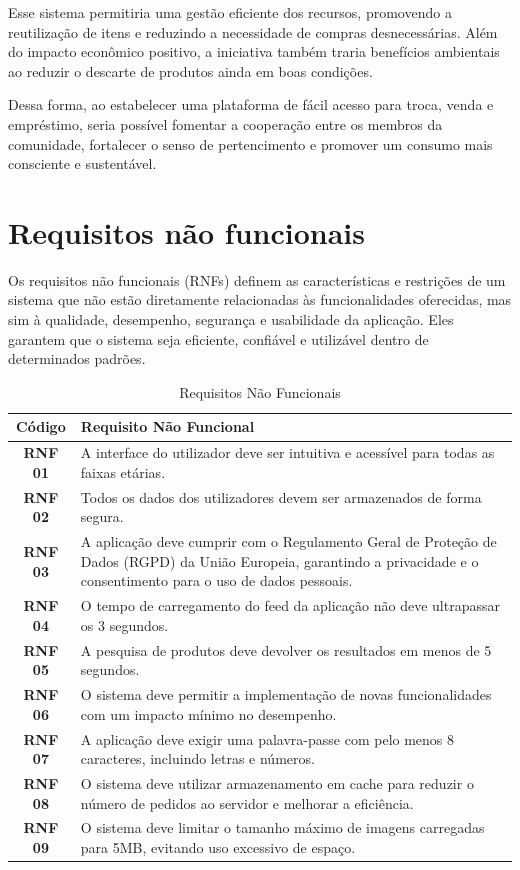\documentclass[a4paper, 12pt]{article} %
\begin{document}
Esse sistema permitiria uma gestão eficiente dos recursos, promovendo a reutilização de itens e reduzindo a necessidade de compras desnecessárias. Além do impacto econômico positivo, a iniciativa também traria benefícios ambientais ao reduzir o descarte de produtos ainda em boas condições.

Dessa forma, ao estabelecer uma plataforma de fácil acesso para troca, venda e empréstimo, seria possível fomentar a cooperação entre os membros da comunidade, fortalecer o senso de pertencimento e promover um consumo mais consciente e sustentável.

\newpage
\section*{Requisitos não funcionais}

Os requisitos não funcionais (RNFs) definem as características e restrições de um sistema que não estão diretamente relacionadas às funcionalidades oferecidas, mas sim à qualidade, desempenho, segurança e usabilidade da aplicação. Eles garantem que o sistema seja eficiente, confiável e utilizável dentro de determinados padrões.

\begin{table}[H]
	\centering
	\renewcommand{\arraystretch}{1.3}
	\begin{tabular}{|c|p{12cm}|}
		\hline
		\textbf{Código} & \textbf{Requisito Não Funcional} \\
		\hline
		\textbf{RNF 01} & A interface do utilizador deve ser intuitiva e acessível para todas as faixas etárias. \\
		\hline
		\textbf{RNF 02} & Todos os dados dos utilizadores devem ser armazenados de forma segura. \\
		\hline
		\textbf{RNF 03} & 	A aplicação deve cumprir com o Regulamento Geral de Proteção de Dados (RGPD) da União Europeia, garantindo a privacidade e o consentimento para o uso de dados pessoais. \\
		\hline
		\textbf{RNF 04} & O tempo de carregamento do feed da aplicação não deve ultrapassar os 3 segundos. \\
		\hline
		\textbf{RNF 05} & A pesquisa de produtos deve devolver os resultados em menos de 5 segundos.\\
		\hline
		\textbf{RNF 06} & O sistema deve permitir a implementação de novas funcionalidades com um impacto mínimo no desempenho. \\
		\hline
		\textbf{RNF 07} & A aplicação deve exigir uma palavra-passe com pelo menos 8 caracteres, incluindo letras e números. \\
		\hline
		\textbf{RNF 08} & O sistema deve utilizar armazenamento em cache para reduzir o número de pedidos ao servidor e melhorar a eficiência. \\
		\hline
		\textbf{RNF 09} & O sistema deve limitar o tamanho máximo de imagens carregadas para 5MB, evitando uso excessivo de espaço. \\
		\hline
	\end{tabular}
	\caption{Requisitos Não Funcionais}
	\label{tab:requisitos_nao_funcionais}
\end{table}
\end{document}

